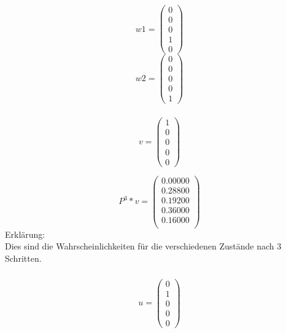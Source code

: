 \documentclass{article}
\begin{document}
\[
w1=
  \begin{pmatrix}
    0 \\
    0 \\
    0 \\
    1 \\
    0 
    
  \end{pmatrix}
\]
\[
w2=
  \begin{pmatrix}
    0 \\
    0 \\
    0 \\
    0 \\
    1 
    
  \end{pmatrix}
\]

\subsubsection{}
\[
v=
  \begin{pmatrix}
    1 \\
    0 \\
    0 \\
    0 \\
    0 
    
  \end{pmatrix}
\]

\[
P^3 * v=
  \begin{pmatrix}
    0.00000 \\
    0.28800 \\
    0.19200 \\
    0.36000 \\
    0.16000 \\
    
  \end{pmatrix}
\]
Erklärung: \\
Dies sind die Wahrscheinlichkeiten für die verschiedenen Zustände nach 3 Schritten.

\subsubsection{}
\[
u=
  \begin{pmatrix}
    0 \\
    1 \\
    0 \\
    0 \\
    0 
    
  \end{pmatrix}
\]
\end{document}
